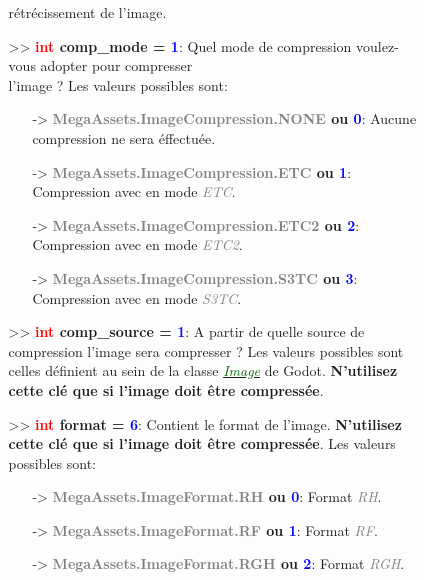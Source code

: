 \documentclass[a4paper, 11pt]{article}
\begin{document}
\begin{description}
\begin{itemize}
\begin{itemize}
				rétrécissement de l'image.\\
				\item[>> \textbf{\textcolor{red}{int} comp\_mode = \textcolor{blue}{1}}:] Quel mode de
				compression voulez-vous adopter pour compresser \\l'image ? Les valeurs possibles sont:
				\begin{itemize}
					\item [-> \textbf{\textcolor{gray}{MegaAssets.ImageCompression.NONE} ou \textcolor{blue}
					{0}}:] Aucune compression ne sera éffectuée.
					\item [-> \textbf{\textcolor{gray}{MegaAssets.ImageCompression.ETC} ou \textcolor{blue}
					{1}}:] Compression avec en mode \textit{\textcolor{gray}{ETC}}.
					\item [-> \textbf{\textcolor{gray}{MegaAssets.ImageCompression.ETC2} ou \textcolor{blue}
					{2}}:] Compression avec en mode \textit{\textcolor{gray}{ETC2}}.
					\item [-> \textbf{\textcolor{gray}{MegaAssets.ImageCompression.S3TC} ou \textcolor{blue}
					{3}}:] Compression avec en mode \textit{\textcolor{gray}{S3TC}}.\\
				\end{itemize}
				\item[>> \textbf{\textcolor{red}{int} comp\_source = \textcolor{blue}{1}}:] A partir de
				quelle source de compression l'image sera compresser ? Les valeurs possibles sont celles
				définient au sein de la classe \href{https://docs.godotengine.org/en/stable/classes/class_image.html#enum-image-compresssource}{\textit{\textcolor{darkgreen}{Image}}} de Godot.
				\textbf{N'utilisez cette clé que si l'image doit être compressée}.\\
				\item[>> \textbf{\textcolor{red}{int} format = \textcolor{blue}{6}}:] Contient le format de
				l'image. \textbf{N'utilisez cette clé que si l'image doit être compressée}. Les valeurs
				possibles sont:
				\begin{itemize}
					\item [-> \textbf{\textcolor{gray}{MegaAssets.ImageFormat.RH} ou \textcolor{blue}
					{0}}:] Format \textit{\textcolor{gray}{RH}}.
					\item [-> \textbf{\textcolor{gray}{MegaAssets.ImageFormat.RF} ou \textcolor{blue}
					{1}}:] Format \textit{\textcolor{gray}{RF}}.
					\item [-> \textbf{\textcolor{gray}{MegaAssets.ImageFormat.RGH} ou \textcolor{blue}
					{2}}:] Format \textit{\textcolor{gray}{RGH}}.

\end{itemize}
\end{itemize}
\end{itemize}
\end{description}
\end{document}
